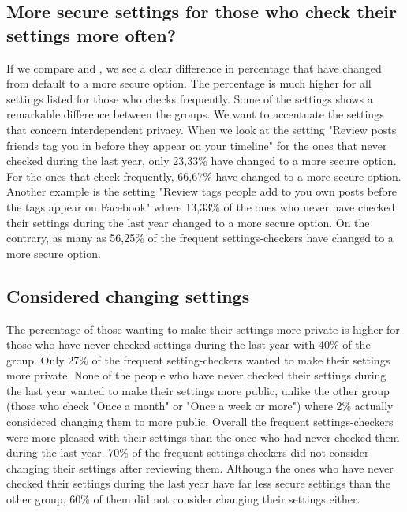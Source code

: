 \subsection{More secure settings for those who check their settings more often?}
If we compare  and , we see a clear difference in percentage that have changed from default to a more secure option. The percentage is much higher for all settings listed for those who checks frequently. Some of the settings shows a remarkable difference between the groups. We want to accentuate the settings that concern interdependent privacy. When we look at the setting "Review posts friends tag you in before they appear on your timeline" for the ones that never checked during the last year, only 23,33\% have changed to a more secure option. For the ones that check frequently, 66,67\% have changed to a more secure option. Another example is the setting "Review tags people add to you own posts before the tags appear on Facebook" where 13,33\% of the ones who never have checked their settings during the last year changed to a more secure option. On the contrary, as many as 56,25\% of the frequent settings-checkers have changed to a more secure option.

\subsection{Considered changing settings}
The percentage of those wanting to make their settings more private is higher for those who have never checked settings during the last year with 40\% of the group. Only 27\% of the frequent setting-checkers wanted to make their settings more private. 
None of the people who have never checked their settings during the last year wanted to make their settings more public, unlike the other group (those who check "Once a month" or "Once a week or more") where 2\% actually considered changing them to more public. Overall the frequent settings-checkers were more pleased with their settings than the once who had never checked them during the last year. 70\% of the frequent settings-checkers did not consider changing their settings after reviewing them. Although the ones who have never checked their settings during the last year have far less secure settings than the other group, 60\% of them did not consider changing their settings either. 


